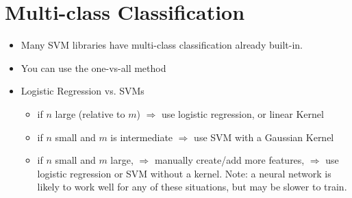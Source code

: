 \documentclass[a4paper,12pt]{report}
\begin{document}
\section{Multi-class Classification}
\begin{itemize}
\item Many SVM libraries have multi-class classification already built-in. \\
	\item You can use the one-vs-all method
\end{itemize}
\begin{itemize}
	\item Logistic Regression vs. SVMs
		\begin{itemize}
			\item if $n$ large (relative to $m$) $\Rightarrow$ use logistic regression, or linear Kernel
			\item if $n$ small and $m$ is intermediate $\Rightarrow$ use SVM with a Gaussian Kernel
			\item if $n$ small and $m$ large, $\Rightarrow$ manually create/add more features, $\Rightarrow$ use logistic regression or SVM without a kernel.
Note: a neural network is likely to work well for any of these situations, but may be slower to train.
		\end{itemize}
\end{itemize}
\end{document}
